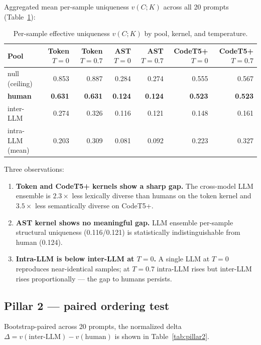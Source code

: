 \documentclass{article}
\begin{document}
Aggregated mean per-sample uniqueness $v(C;K)$ across all 20 prompts
(Table~\ref{tab:pillar1}):

\begin{table}[h]
\centering
\small
\begin{tabular}{lrrrrrr}
\toprule
Pool & Token $T=0$ & Token $T=0.7$ & AST $T=0$ & AST $T=0.7$ & CodeT5+ $T=0$ & CodeT5+ $T=0.7$ \\
\midrule
null (ceiling)   & 0.853 & 0.887 & 0.284 & 0.274 & 0.555 & 0.567 \\
\textbf{human}   & \textbf{0.631} & \textbf{0.631} & \textbf{0.124} & \textbf{0.124} & \textbf{0.523} & \textbf{0.523} \\
inter-LLM        & 0.274 & 0.326 & 0.116 & 0.121 & 0.148 & 0.161 \\
intra-LLM (mean) & 0.203 & 0.309 & 0.081 & 0.092 & 0.223 & 0.327 \\
\bottomrule
\end{tabular}
\caption{Per-sample effective uniqueness $v(C;K)$ by pool, kernel, and
temperature.}
\label{tab:pillar1}
\end{table}

Three observations:
\begin{enumerate}[leftmargin=*]
  \item \textbf{Token and CodeT5+ kernels show a sharp gap.} The cross-model
    LLM ensemble is $2.3\times$ less lexically diverse than humans on the
    token kernel and $3.5\times$ less semantically diverse on CodeT5+.
  \item \textbf{AST kernel shows no meaningful gap.} LLM ensemble per-sample
    structural uniqueness (0.116/0.121) is statistically indistinguishable
    from human (0.124).
  \item \textbf{Intra-LLM is below inter-LLM at $T=0$.} A single LLM at
    $T=0$ reproduces near-identical samples; at $T=0.7$ intra-LLM rises
    but inter-LLM rises proportionally --- the gap to humans persists.
\end{enumerate}

\subsection{Pillar 2 --- paired ordering test}

Bootstrap-paired across 20 prompts, the normalized delta
$\Delta = v(\text{inter-LLM}) - v(\text{human})$ is shown in
Table~\ref{tab:pillar2}.
\end{document}
